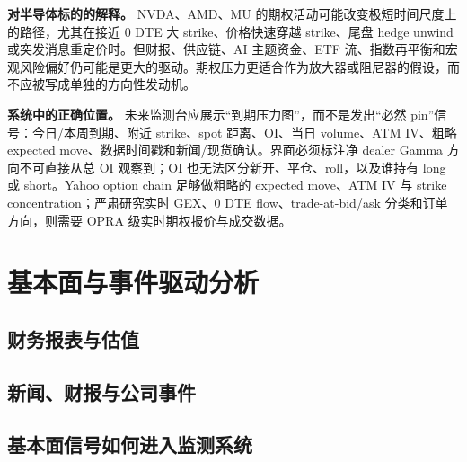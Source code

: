 \textbf{对半导体标的的解释。} NVDA、AMD、MU 的期权活动可能改变极短时间尺度上的路径，尤其在接近 \(0\) DTE 大 strike、价格快速穿越 strike、尾盘 hedge unwind 或突发消息重定价时。但财报、供应链、AI 主题资金、ETF 流、指数再平衡和宏观风险偏好仍可能是更大的驱动。期权压力更适合作为放大器或阻尼器的假设，而不应被写成单独的方向性发动机。

\textbf{系统中的正确位置。} 未来监测台应展示“到期压力图”，而不是发出“必然 pin”信号：今日/本周到期、附近 strike、spot 距离、OI、当日 volume、ATM IV、粗略 expected move、数据时间戳和新闻/现货确认。界面必须标注净 dealer Gamma 方向不可直接从总 OI 观察到；OI 也无法区分新开、平仓、roll，以及谁持有 long 或 short。Yahoo option chain 足够做粗略的 expected move、ATM IV 与 strike concentration；严肃研究实时 GEX、\(0\) DTE flow、trade-at-bid/ask 分类和订单方向，则需要 OPRA 级实时期权报价与成交数据。


\section{基本面与事件驱动分析}

\subsection{财务报表与估值}

\subsection{新闻、财报与公司事件}

\subsection{基本面信号如何进入监测系统}

